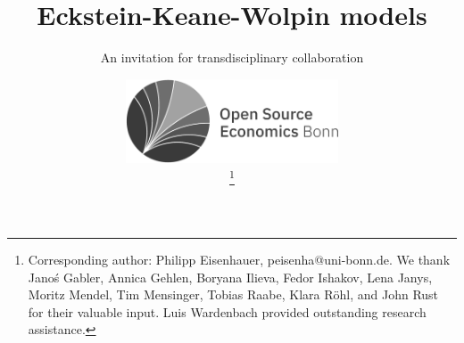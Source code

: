 
\title{Eckstein-Keane-Wolpin models}
\subtitle{An invitation for transdisciplinary collaboration}
\author{
	\includegraphics[height=2.5cm]{../material/crop-ose-logo-black-white.pdf} \vspace{-1.8cm} \\ \hspace{6.1cm}
	\thanks{Corresponding author: Philipp Eisenhauer, peisenha@uni-bonn.de. We thank  Jano\'s Gabler, Annica Gehlen, Boryana Ilieva, Fedor Ishakov, Lena Janys, Moritz Mendel, Tim Mensinger, Tobias Raabe, Klara R\"ohl, and John Rust for their valuable input. Luis Wardenbach provided outstanding research assistance.}}
\date{}
